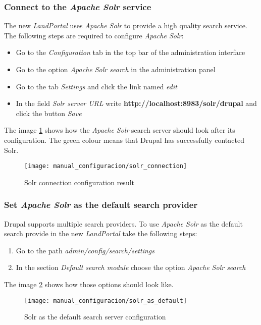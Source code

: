 \subsubsection{Connect to the \textit{Apache Solr} service}
The new \textit{LandPortal} uses \textit{Apache Solr} to provide a high quality search service.  The following steps are required to configure \textit{Apache Solr}:
\begin{itemize}
	\item Go to the \textit{Configuration} tab in the top bar of the administration interface
	\item Go to the option \textit{Apache Solr search} in the administration panel
	\item Go to the tab \textit{Settings} and click the link named \textit{edit}
	\item In the field \textit{Solr server URL} write \textbf{http://localhost:8983/solr/drupal} and click the button \textit{Save}
\end{itemize}
The image \ref{fig:manual_configuracion_solrconnection} shows how the \textit{Apache Solr} search server should look after its configuration.  The green colour means that Drupal has successfully contacted Solr.
\begin{figure}[h]
	\centering
	\texttt{[image: manual\_configuracion/solr\_connection]}
	\caption{Solr connection configuration result}
	\label{fig:manual_configuracion_solrconnection}
\end{figure}

\subsubsection{Set \textit{Apache Solr} as the default search provider}
Drupal supports multiple search providers.  To use \textit{Apache Solr} as the default search provide in the new \textit{LandPortal} take the following steps:
\begin{enumerate}
	\item Go to the path \textit{admin/config/search/settings}
	\item In the section \textit{Default search module} choose the option \textit{Apache Solr search}
\end{enumerate}
The image \ref{fig:manual_configuracion_solr} shows how those options should look like.
\begin{figure}[h]
	\centering
	\texttt{[image: manual\_configuracion/solr\_as\_default]}
	\caption{Solr as the default search server configuration}
	\label{fig:manual_configuracion_solr}
\end{figure}


